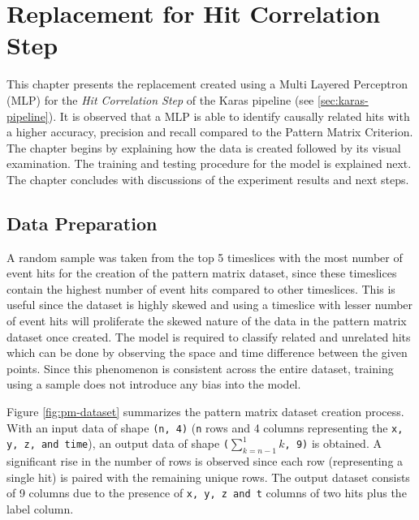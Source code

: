 
\chapter{Replacement for Hit Correlation Step} %
\label{cha:pm}

% 
This chapter presents the replacement created using a Multi Layered
Perceptron (MLP) for the \textit{Hit Correlation Step} of the Karas
pipeline (see \ref{sec:karas-pipeline}). It is observed that a MLP is
able to identify causally related hits with a higher accuracy,
precision and recall compared to the Pattern Matrix Criterion. The
chapter begins by explaining how the data is created followed by its
visual examination. The training and testing procedure for the model
is explained next. The chapter concludes with discussions of the
experiment results and next steps.

\section{Data Preparation}
\label{sec:pm-data-prep}

A random sample was taken from the top 5 timeslices with the most
number of event hits for the creation of the pattern matrix dataset,
since these timeslices contain the highest number of event hits
compared to other timeslices. This is useful since the dataset is
highly skewed and using a timeslice with lesser number of event hits
will proliferate the skewed nature of the data in the pattern matrix
dataset once created. The model is required to classify related and
unrelated hits which can be done by observing the space and time
difference between the given points. Since this phenomenon is
consistent across the entire dataset, training using a sample does not
introduce any bias into the model.

Figure \ref{fig:pm-dataset} summarizes the pattern matrix dataset
creation process. With an input data of shape \texttt{(n, 4)}
(\texttt{n} rows and 4 columns representing the \texttt{x, y, z, and
  time}), an output data of shape \texttt{($\sum_{k=n-1}^{1}k$, 9)} is
obtained. A significant rise in the number of rows is observed since
each row (representing a single hit) is paired with the remaining
unique rows. The output dataset consists of 9 columns due to the
presence of \texttt{x, y, z and t} columns of two hits plus the
label column.

